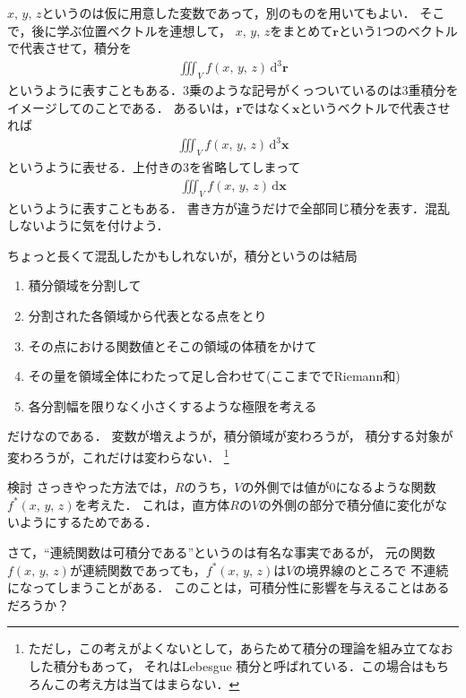 $x, \, y, \, z$というのは仮に用意した変数であって，別のものを用いてもよい．
そこで，後に学ぶ位置ベクトルを連想して，
$x, \, y, \, z$をまとめて$\bm{r}$という1つのベクトルで代表させて，積分を
\begin{align*}
\iiint_V f(x, \, y, \, z) \, \mathrm{d}^3 \bm{r}
\end{align*}
というように表すこともある．3乗のような記号がくっついているのは3重積分をイメージしてのことである．
あるいは，$\bm{r}$ではなく$\bm{x}$というベクトルで代表させれば
\begin{align*}
\iiint_V f(x, \, y, \, z) \, \mathrm{d}^3 \bm{x}
\end{align*}
というように表せる．上付きの3を省略してしまって
\begin{align*}
\iiint_V f(x, \, y, \, z) \, \mathrm{d} \bm{x}
\end{align*}
というように表すこともある．
書き方が違うだけで全部同じ積分を表す．混乱しないように気を付けよう．



ちょっと長くて混乱したかもしれないが，積分というのは結局
\begin{enumerate}
\item 積分領域を分割して
\item 分割された各領域から代表となる点をとり
\item その点における関数値とそこの領域の体積をかけて
\item その量を領域全体にわたって足し合わせて(ここまででRiemann和)
\item 各分割幅を限りなく小さくするような極限を考える
\end{enumerate}
だけなのである．
変数が増えようが，積分領域が変わろうが，
積分する対象が変わろうが，これだけは変わらない．
\footnote{ただし，この考えがよくないとして，あらためて積分の理論を組み立てなおした積分もあって，
それはLebesgue
積分と呼ばれている．この場合はもちろんこの考え方は当てはまらない．}
\begin{itembox}[l]{検討}
さっきやった方法では，$R$のうち，$V$の外側では値が0になるような関数$f^*(x, \, y, \, z)$を考えた．
これは，直方体$R$の$V$の外側の部分で積分値に変化がないようにするためである．

さて，``連続関数は可積分である''というのは有名な事実であるが，
元の関数$f(x, \, y, \, z)$が連続関数であっても，$f^*(x, \, y, \, z)$は$V$の境界線のところで
不連続になってしまうことがある．
このことは，可積分性に影響を与えることはあるだろうか？
\end{itembox}

